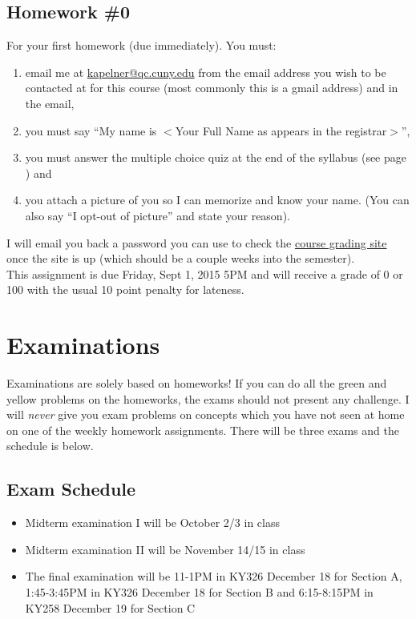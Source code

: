 \documentclass[12pt]{article}
\newcommand{\qu}[1]{``#1''}
\begin{document}
\subsection*{Homework \#0}

For your first homework (due immediately). You must:

\begin{enumerate}[(1)]
\item email me at \href{kapelner@qc.cuny.edu}{kapelner@qc.cuny.edu} from the email address you wish to be contacted at for this course (most commonly this is a gmail address) and in the email,
\item you must say \qu{My name is $<$Your Full Name as appears in the registrar$>$},
\item you must answer the multiple choice quiz at the end of the syllabus (see page \pageref{quiz}) and
\item you attach a picture of you so I can memorize and know your name. (You can also say \qu{I opt-out of picture} and state your reason).
\end{enumerate}

I will email you back a password you can use to check the \href{http://gradesly.com}{course grading site} once the site is up (which should be a couple weeks into the semester). \\

This assignment is due Friday, Sept 1, 2015 5PM and will receive a grade of 0 or 100 with the usual 10 point penalty for lateness.


\section*{Examinations}

Examinations are solely based on homeworks! If you can do all the green and yellow problems on the homeworks, the exams should not present any challenge. I will \textit{never} give you exam problems on concepts which you have not seen at home on one of the weekly homework assignments. There will be three exams and the schedule is below.

\subsection*{Exam Schedule}\label{subsec:exam_schedule}

\begin{itemize}
\itemsep -0.0em 
\item Midterm examination I will be October 2/3 in class
\item Midterm examination II will be November 14/15 in class
\item The final examination will be 11-1PM in KY326 December 18 for Section A, 1:45-3:45PM in KY326 December 18 for Section B and 6:15-8:15PM in KY258 December 19 for Section C
\end{itemize}
\end{document}

